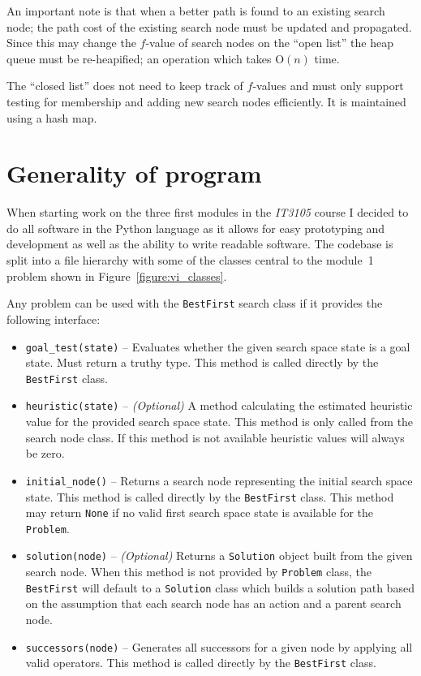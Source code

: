 An important note is that when a better path is found to an existing search node; the path cost of the existing search node must be updated and propagated. Since this may change the $f$-value of search nodes on the ``open list'' the heap queue must be re-heapified; an operation which takes O$(n)$ time.

The ``closed list'' does not need to keep track of $f$-values and must only support testing for membership and adding new search nodes efficiently. It is maintained using a hash map.

\section*{Generality of program}

When starting work on the three first modules in the \textit{IT3105} course I decided to do all software in the Python language as it allows for easy prototyping and development as well as the ability to write readable software. The codebase is split into a file hierarchy with some of the classes central to the module~1 problem shown in Figure~\ref{figure:vi_classes}.

Any problem can be used with the \texttt{BestFirst} search class if it provides the following interface:

\begin{itemize}
\item \texttt{goal\_test(state)} -- Evaluates whether the given search space state is a goal state. Must return a truthy type. This method is called directly by the \texttt{BestFirst} class.
\item \texttt{heuristic(state)} -- \textit{(Optional)} A method calculating the estimated heuristic value for the provided search space state. This method is only called from the search node class. If this method is not available heuristic values will always be zero.
\item \texttt{initial\_node()} -- Returns a search node representing the initial search space state. This method is called directly by the \texttt{BestFirst} class. This method may return \texttt{None} if no valid first search space state is available for the \texttt{Problem}.
\item \texttt{solution(node)} -- \textit{(Optional)} Returns a \texttt{Solution} object built from the given search node. When this method is not provided by \texttt{Problem} class, the \texttt{BestFirst} will default to a \texttt{Solution} class which builds a solution path based on the assumption that each search node has an action and a parent search node.
\item \texttt{successors(node)} -- Generates all successors for a given node by applying all valid operators. This method is called directly by the \texttt{BestFirst} class.
\end{itemize}


